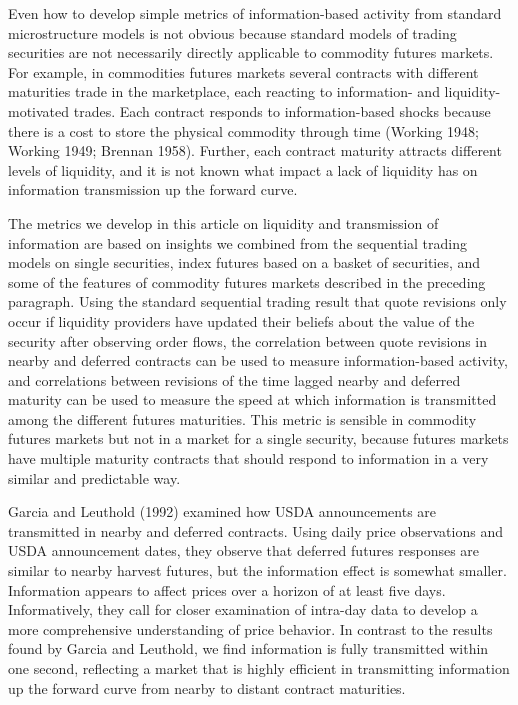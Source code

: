 \documentclass[review,12pt]{elsarticle}
\begin{document}
\begin{linenumbers}
Even how to develop simple metrics of information-based activity from
standard microstructure models is not obvious because standard models of
trading securities are not necessarily directly applicable to commodity
futures markets. For example, in commodities futures markets several
contracts with different maturities trade in the marketplace, each
reacting to information- and liquidity-motivated trades. Each contract
responds to information-based shocks because there is a cost to store
the physical commodity through time (Working 1948; Working 1949; Brennan
1958). Further, each contract maturity attracts different levels of
liquidity, and it is not known what impact a lack of liquidity has on
information transmission up the forward curve.

The metrics we develop in this article on liquidity and transmission of
information are based on insights we combined from the sequential
trading models on single securities, index futures based on a basket of
securities, and some of the features of commodity futures markets
described in the preceding paragraph. Using the standard sequential
trading result that quote revisions only occur if liquidity providers
have updated their beliefs about the value of the security after
observing order flows, the correlation between quote revisions in nearby
and deferred contracts can be used to measure information-based
activity, and correlations between revisions of the time lagged nearby
and deferred maturity can be used to measure the speed at which
information is transmitted among the different futures maturities. This
metric is sensible in commodity futures markets but not in a market for
a single security, because futures markets have multiple maturity
contracts that should respond to information in a very similar and
predictable way.

Garcia and Leuthold (1992) examined how USDA announcements are
transmitted in nearby and deferred contracts. Using daily price
observations and USDA announcement dates, they observe that deferred
futures responses are similar to nearby harvest futures, but the
information effect is somewhat smaller. Information appears to affect
prices over a horizon of at least five days. Informatively, they call
for closer examination of intra-day data to develop a more comprehensive
understanding of price behavior. In contrast to the results found by
Garcia and Leuthold, we find information is fully transmitted within one
second, reflecting a market that is highly efficient in transmitting
information up the forward curve from nearby to distant contract
maturities.


\end{linenumbers}
\end{document}
